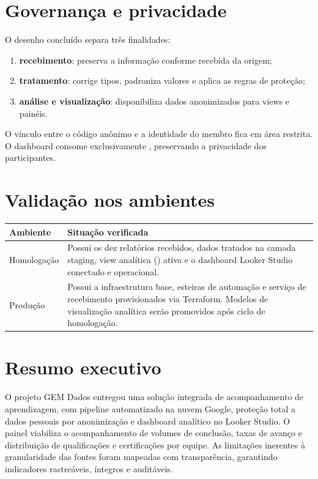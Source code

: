 \documentclass[11pt,a4paper]{article}
\begin{document}
\section{Governança e privacidade}

O desenho concluído separa três finalidades:

\begin{enumerate}
  \item \textbf{recebimento}: preserva a informação conforme recebida da origem;
  \item \textbf{tratamento}: corrige tipos, padroniza valores e aplica as regras de proteção;
  \item \textbf{análise e visualização}: disponibiliza dados anonimizados para views e painéis.
\end{enumerate}

O vínculo entre o código anônimo e a identidade do membro fica em área
restrita. O dashboard consome exclusivamente , preservando a privacidade
dos participantes.

\section{Validação nos ambientes}

\begin{tabularx}{\textwidth}{L{38mm}Y}
\toprule
\textbf{Ambiente} & \textbf{Situação verificada} \\
\midrule
Homologação & Possui os dez relatórios recebidos, dados tratados na camada staging, view analítica () ativa e o dashboard Looker Studio conectado e operacional. \\
Produção & Possui a infraestrutura base, esteiras de automação e serviço de recebimento provisionados via Terraform. Modelos de visualização analítica serão promovidos após ciclo de homologação. \\
\bottomrule
\end{tabularx}

\section{Resumo executivo}

O projeto GEM Dados entregou uma solução integrada de acompanhamento de aprendizagem,
com pipeline automatizado na nuvem Google, proteção total a dados pessoais por
anonimização e dashboard analítico no Looker Studio. O painel viabiliza o acompanhamento
de volumes de conclusão, taxas de avanço e distribuição de qualificações
e certificações por equipe. As limitações inerentes à granularidade das fontes foram
mapeadas com transparência, garantindo indicadores rastreáveis, íntegros e auditáveis.
\end{document}

